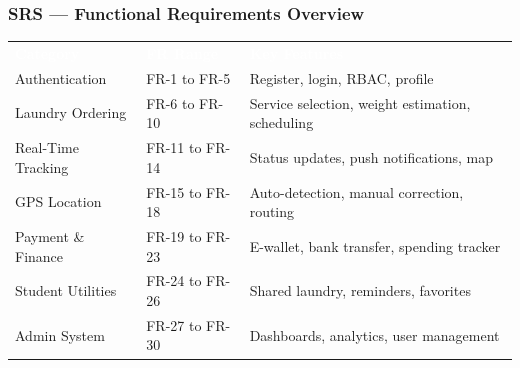 \documentclass[aspectratio=169,professionalfonts,10pt]{beamer}
\begin{document}
\begin{frame}
    \frametitle{SRS --- Functional Requirements Overview}
    \small
    \begin{table}
        \centering\scriptsize
        \begin{tabular}{lll}
            \rowcolor{ugmBlue!40}
            \textcolor{white}{\textbf{Category}} & \textcolor{white}{\textbf{FR Range}} & \textcolor{white}{\textbf{Key Features}} \\
            Authentication & FR-1 to FR-5 & Register, login, RBAC, profile \\
            Laundry Ordering & FR-6 to FR-10 & Service selection, weight estimation, scheduling \\
            Real-Time Tracking & FR-11 to FR-14 & Status updates, push notifications, map \\
            GPS Location & FR-15 to FR-18 & Auto-detection, manual correction, routing \\
            Payment \& Finance & FR-19 to FR-23 & E-wallet, bank transfer, spending tracker \\
            Student Utilities & FR-24 to FR-26 & Shared laundry, reminders, favorites \\
            Admin System & FR-27 to FR-30 & Dashboards, analytics, user management \\
        \end{tabular}
    \end{table}
\end{frame}
\end{document}
